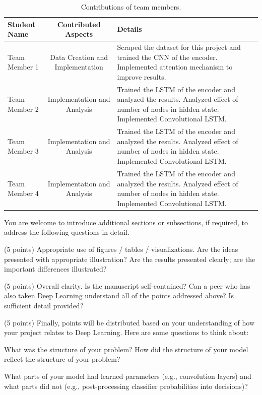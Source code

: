 \documentclass[10pt,twocolumn,letterpaper]{article}
\begin{document}
\begin{table}
\begin{center}
\begin{tabular}{|l|c|p{8cm}|}
\hline
Student Name & Contributed Aspects & Details \\
\hline\hline
Team Member 1 & Data Creation and Implementation & Scraped the dataset for this project and trained the CNN of the encoder. Implemented attention mechanism to improve results. \\
Team Member 2 & Implementation and Analysis & Trained the LSTM of the encoder and analyzed the results. Analyzed effect of number of nodes in hidden state.  Implemented Convolutional LSTM. \\
Team Member 3 & Implementation and Analysis & Trained the LSTM of the encoder and analyzed the results. Analyzed effect of number of nodes in hidden state.  Implemented Convolutional LSTM. \\
Team Member 4 & Implementation and Analysis & Trained the LSTM of the encoder and analyzed the results. Analyzed effect of number of nodes in hidden state.  Implemented Convolutional LSTM. \\
\hline
\end{tabular}
\end{center}
\caption{Contributions of team members.}
\label{tab:contributions}
\end{table}



You are welcome to introduce additional sections or subsections, if required, to address the following questions in detail. 

(5 points) Appropriate use of figures / tables / visualizations. Are the ideas presented with appropriate illustration? Are the results presented clearly; are the important differences illustrated? 

(5 points) Overall clarity. Is the manuscript self-contained? Can a peer who has also taken Deep Learning understand all of the points addressed above? Is sufficient detail provided? 

(5 points) Finally, points will be distributed based on your understanding of how your project relates to Deep Learning. Here are some questions to think about: 

What was the structure of your problem? How did the structure of your model reflect the structure of your problem? 

What parts of your model had learned parameters (e.g., convolution layers) and what parts did not (e.g., post-processing classifier probabilities into decisions)? 
\end{document}
